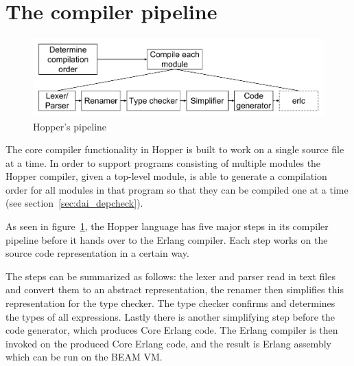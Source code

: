 \section{The compiler pipeline}


\begin{figure}[h!]
\centering
  \includegraphics[width=0.6\pdfpagewidth]{figure/pipeline}
  \caption{Hopper's pipeline}
  \label{fig:pipeline}
\end{figure}

The core compiler functionality in Hopper is built to work on a single source file at a time.
In order to support programs consisting of multiple modules the Hopper compiler,
given a top-level module, is able to generate a compilation order for all modules in that
program so that they can be compiled one at a time (see section~\ref{sec:dai_depcheck}).

As seen in figure~\ref{fig:pipeline}, the Hopper language has five major steps in its compiler
pipeline before it hands over to the Erlang compiler. Each step works on the 
source code representation in a certain way.

The steps can be summarized as follows: the lexer and parser read in text files and convert
them to an abstract representation, the renamer then simplifies this representation for the 
type checker. The type checker confirms and determines the types of all expressions. Lastly 
there is another simplifying step before the code generator, which produces Core
Erlang code. The Erlang compiler is then invoked on the produced Core Erlang
code, and the result is Erlang assembly which can be run on the BEAM VM.